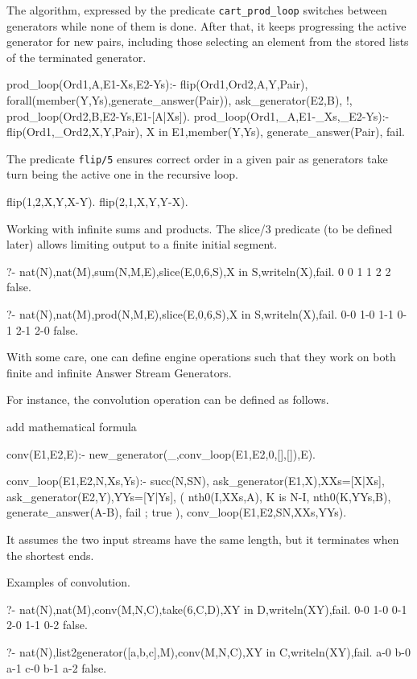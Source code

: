 \documentclass{new_tlp}
\begin{document}
The algorithm, expressed by the predicate {\tt cart\_prod\_loop}
switches between generators while none of them is done.
After that, it keeps progressing the active generator 
for new pairs, including those selecting an element 
from the stored lists of the terminated generator.
\begin{code}
prod_loop(Ord1,A,E1-Xs,E2-Ys):-
  flip(Ord1,Ord2,A,Y,Pair),
  forall(member(Y,Ys),generate_answer(Pair)),
  ask_generator(E2,B),
  !,
  prod_loop(Ord2,B,E2-Ys,E1-[A|Xs]).
prod_loop(Ord1,_A,E1-_Xs,_E2-Ys):-
  flip(Ord1,_Ord2,X,Y,Pair),
  X in E1,member(Y,Ys),
  generate_answer(Pair),
  fail.
\end{code}

The predicate {\tt flip/5} ensures correct order in a given pair
as  generators take turn being the active one in the recursive loop. 
\begin{code} 
flip(1,2,X,Y,X-Y).
flip(2,1,X,Y,Y-X).
\end{code}

\BX
Working with infinite sums and products. The slice/3 predicate (to be defined later) allows limiting output to a finite initial segment.
\begin{codex}
?- nat(N),nat(M),sum(N,M,E),slice(E,0,6,S),X in S,writeln(X),fail.
0
0
1
1
2
2
false.

?- nat(N),nat(M),prod(N,M,E),slice(E,0,6,S),X in S,writeln(X),fail.
0-0
1-0
1-1
0-1
2-1
2-0
false.
\end{codex}
\EX


With some care, one can define engine operations such that they work on both
finite and infinite Answer Stream Generators.

For instance, the convolution operation can be defined as follows.


{\Large add mathematical formula}

\begin{code}

conv(E1,E2,E):-
  new_generator(_,conv_loop(E1,E2,0,[],[]),E).

conv_loop(E1,E2,N,Xs,Ys):-
  succ(N,SN),
  ask_generator(E1,X),XXs=[X|Xs],
  ask_generator(E2,Y),YYs=[Y|Ys],
  ( nth0(I,XXs,A),
    K is N-I,
    nth0(K,YYs,B),
    generate_answer(A-B),
    fail
  ; true  
  ),
  conv_loop(E1,E2,SN,XXs,YYs).
\end{code}

It assumes the two input streams have the same length, but it terminates
when the shortest ends. 

\BX
Examples of convolution.
\begin{codex}
?- nat(N),nat(M),conv(M,N,C),take(6,C,D),XY in D,writeln(XY),fail.
0-0
1-0
0-1
2-0
1-1
0-2
false.

?- nat(N),list2generator([a,b,c],M),conv(M,N,C),XY in C,writeln(XY),fail.
a-0
b-0
a-1
c-0
b-1
a-2
false.
\end{codex}
\EX
\end{document}
